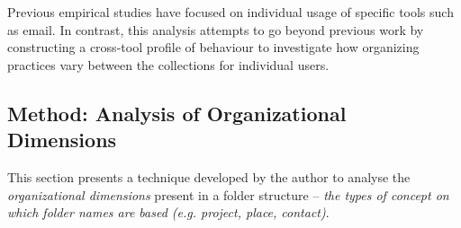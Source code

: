Previous empirical studies have focused on individual usage of specific tools such as email. In contrast, this analysis attempts to go beyond previous work by constructing a cross-tool profile of behaviour to investigate how organizing practices vary between the collections for individual users.  %






\subsection{Method: Analysis of Organizational Dimensions}
\label{exp-study:folder-analysis-orgdim}
This section presents a technique developed by the author to analyse the \textit{organizational dimensions} present in a folder structure -- \textit{the types of concept on which folder names are based (e.g. project, place, contact)}.


